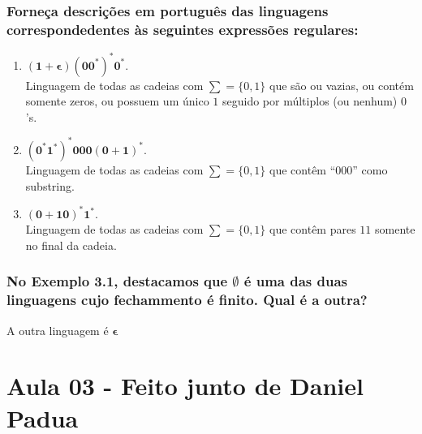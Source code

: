 \documentclass[a4paper,12pt]{article}
\begin{document}
            \subsubsection{Forneça descrições em português das linguagens correspon\-dedentes às seguintes expressões regulares:}
            \begin{enumerate}[label={\bfseries \alph*)}]
                \item $\mathbf{(1+\epsilon)(00^*)^*0^*}$.
                    \\ Linguagem de todas as cadeias com $\sum=\{0,1\}$ que são ou vazias, ou contém somente zeros, ou possuem um único $1$ seguido por múltiplos (ou nenhum) $0$'s.
                \item $\mathbf{(0^*1^*)^*000(0+1)^*}$.
                    \\ Linguagem de todas as cadeias com $\sum=\{0,1\}$ que contêm “000” como substring.
                \item $\mathbf{(0+10)^*1^*}$.
                    \\ Linguagem de todas as cadeias com $\sum=\{0,1\}$ que contêm pares $11$ somente no final da cadeia.
            \end{enumerate}

            \subsubsection{No Exemplo 3.1, destacamos que $\emptyset$ é uma das duas linguagens cujo fechammento é finito. Qual é a outra?}
                A outra linguagem é $\mathbf{\epsilon}$

\section{Aula 03 - Feito junto de Daniel Padua}
\end{document}
